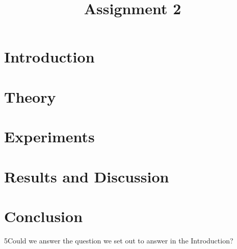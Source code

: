 \documentclass[12pt]{article}
\title{Assignment 2}
\begin{document}
\maketitle

\section{Introduction}


\section{Theory}



\section{Experiments}



\section{Results and Discussion}


\section{Conclusion}

5Could we answer the question we set out to answer in the Introduction?
\end{document}
